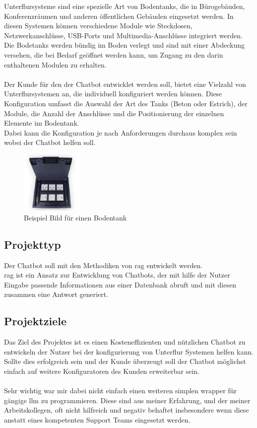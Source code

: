 Unterflursysteme sind eine spezielle Art von Bodentanks, die in Bürogebäuden, Konferenzräumen und anderen öffentlichen Gebäuden eingesetzt werden.
In diesen Systemen können verschiedene Module wie Steckdosen, Netzwerkanschlüsse, USB-Ports und Multimedia-Anschlüsse integriert werden.\\
Die Bodetanks werden bündig im Boden verlegt und sind mit einer Abdeckung versehen, die bei Bedarf geöffnet werden kann, um Zugang zu den darin enthaltenen Modulen zu erhalten.\\\\
Der Kunde für den der Chatbot entwicklet werden soll, bietet eine Vielzahl von Unterflursystemen an, die individuell konfiguriert werden können.
Diese Konfiguration umfasst die Auswahl der Art des Tanks (Beton oder Estrich), der Module, die Anzahl der Anschlüsse und die Positionierung der einzelnen Elemente im Bodentank.\\
Dabei kann die Konfiguration je nach Anforderungen durchaus komplex sein wobei der Chatbot helfen soll.

\begin{figure}[H]
    \begin{center}
        \includegraphics[width=3cm]{bilder/bodentank.jpeg}
        \caption{Beispiel Bild für einen Bodentank}\label{fig:bodentank}
    \end{center}
\end{figure}

\pagebreak
\subsection{Projekttyp}\label{sec:proj_typ}
Der Chatbot soll mit den Methodiken von \gls{rag} entwickelt werden.\\
\gls{rag} ist ein Ansatz zur Entwicklung von Chatbots, der mit hilfe der Nutzer Eingabe
passende Informationen aus einer Datenbank abruft und mit diesen zusammen eine Antwort generiert.

\subsection{Projektziele}\label{sec:proj_ziele}
Das Ziel des Projektes ist es einen Kosteneffizienten und nützlichen Chatbot zu entwickeln der Nutzer
bei der konfigurierung von Unterflur Systemen helfen kann.\\
Sollte dies erfolgreich sein und der Kunde überzeugt soll der Chatbot
möglichst einfach auf weitere Konfiguratoren des Kunden erweiterbar sein.\\\\
Sehr wichtig war mir dabei nicht einfach einen weiteren simplen wrapper für gängige \gls{llm} zu programmieren.
Diese sind aus meiner Erfahrung, und der meiner Arbeitskollegen, oft nicht hilfreich und negativ behaftet insbesondere wenn diese
anstatt eines kompetenten Support Teams eingesetzt werden.

